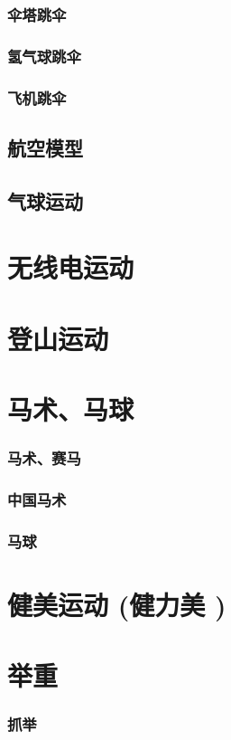 \documentclass[UTF8]{../../ApplicationUniverse}
\begin{document}
        \subsubsection{伞塔跳伞}
        \subsubsection{氢气球跳伞}
        \subsubsection{飞机跳伞}
    \subsection{航空模型}
    \subsection{气球运动}
\section{无线电运动}
\section{登山运动}
\section{马术、马球}
    \subsubsection{马术、赛马}
    \subsubsection{中国马术}
    \subsubsection{马球}
\section{健美运动 (健力美 )}
\section{举重}
    \subsubsection{抓举}
\end{document}
